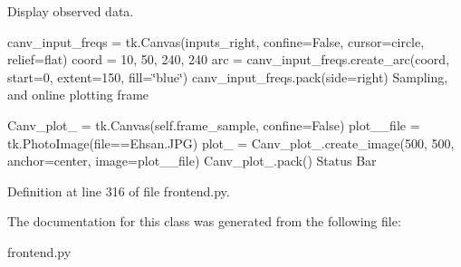 Display observed data. 

canv\+\_\+input\+\_\+freqs = tk.\+Canvas(inputs\+\_\+right, confine=False, cursor=\textquotesingle{}circle\textquotesingle{}, relief=\textquotesingle{}flat\textquotesingle{}) coord = 10, 50, 240, 240 arc = canv\+\_\+input\+\_\+freqs.\+create\+\_\+arc(coord, start=0, extent=150, fill=\char`\"{}blue\char`\"{}) canv\+\_\+input\+\_\+freqs.\+pack(side=\textquotesingle{}right\textquotesingle{}) Sampling, and online plotting frame

Canv\+\_\+plot\+\_ = tk.\+Canvas(self.\+frame\+\_\+sample, confine=False) plot\+\_\+\_\+file = tk.\+Photo\+Image(file==\textquotesingle{}Ehsan.\+J\+PG\textquotesingle{}) plot\+\_ = Canv\+\_\+plot\+\_.\+create\+\_\+image(500, 500, anchor=\textquotesingle{}center\textquotesingle{}, image=plot\+\_\+\_\+file) Canv\+\_\+plot\+\_.\+pack() Status Bar 

Definition at line 316 of file frontend.\+py.



The documentation for this class was generated from the following file\+:\begin{DoxyCompactItemize}
\item 
frontend.\+py\end{DoxyCompactItemize}
